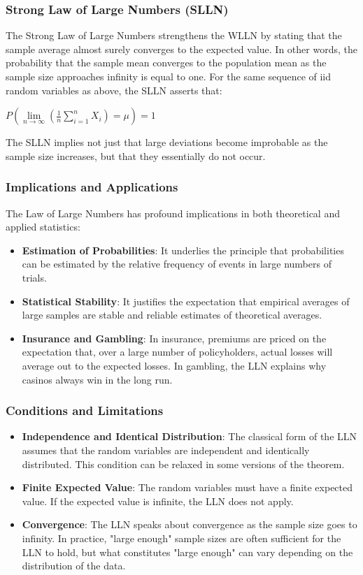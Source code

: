 \documentclass{article}
\begin{document}
\subsubsection{Strong Law of Large Numbers (SLLN)}

The Strong Law of Large Numbers strengthens the WLLN by stating that the sample average almost surely converges to the expected value. In other words, the probability that the sample mean converges to the population mean as the sample size approaches infinity is equal to one. For the same sequence of iid random variables as above, the SLLN asserts that:

$P(\lim\limits_{n\rightarrow \infty} (\frac {1} {n} \sum_{i=1}^{n} X_i)=\mu) =1$

The SLLN implies not just that large deviations become improbable as the sample size increases, but that they essentially do not occur.

\subsubsection{Implications and Applications}

The Law of Large Numbers has profound implications in both theoretical and applied statistics:

\begin{itemize}
    \item \textbf{Estimation of Probabilities}: It underlies the principle that probabilities can be estimated by the relative frequency of events in large numbers of trials.
    \item \textbf{Statistical Stability}: It justifies the expectation that empirical averages of large samples are stable and reliable estimates of theoretical averages.
    \item \textbf{Insurance and Gambling}: In insurance, premiums are priced on the expectation that, over a large number of policyholders, actual losses will average out to the expected losses. In gambling, the LLN explains why casinos always win in the long run.
\end{itemize}

\subsubsection{Conditions and Limitations}

\begin{itemize}
    \item \textbf{Independence and Identical Distribution}: The classical form of the LLN assumes that the random variables are independent and identically distributed. This condition can be relaxed in some versions of the theorem.
    \item \textbf{Finite Expected Value}: The random variables must have a finite expected value. If the expected value is infinite, the LLN does not apply.
    \item \textbf{Convergence}: The LLN speaks about convergence as the sample size goes to infinity. In practice, "large enough" sample sizes are often sufficient for the LLN to hold, but what constitutes "large enough" can vary depending on the distribution of the data.
\end{itemize}
\end{document}
